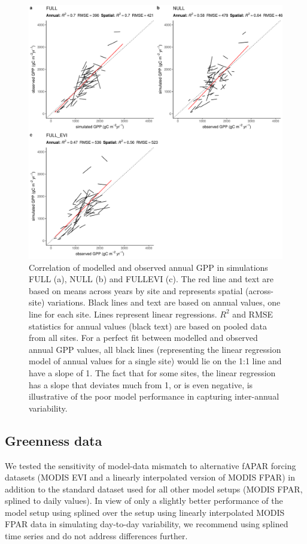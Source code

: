 \documentclass{myreport}
\begin{document}
\begin{figure}[!ht]
    \includegraphics[width=\textwidth]{fig/modobs_spatial_annual.pdf}
    \caption{Correlation of modelled and observed annual GPP in simulations FULL (a), NULL (b) and FULL\textunderscore EVI (c). The red line and text are based on means across years by site and represents spatial (across-site) variations. Black lines and text are based on annual values, one line for each site. Lines represent linear regressions. $R^2$ and RMSE statistics for annual values (black text) are based on pooled data from all sites. For a perfect fit between modelled and observed annual GPP values, all black lines (representing the linear regression model of annual values for a single site) would lie on the 1:1 line and have a slope of 1. The fact that for some sites, the linear regression has a slope that deviates much from 1, or is even negative, is illustrative of the poor model performance in capturing inter-annual variability.}
    \label{fig:modobs_spatialannual}
\end{figure}


\subsection{Greenness data}
\label{sec:results_greenness}

We tested the sensitivity of model-data mismatch to alternative fAPAR forcing datasets (MODIS EVI and a linearly interpolated version of MODIS FPAR) in addition to the standard dataset used for all other model setups (MODIS FPAR, splined to daily values). In view of only a slightly better performance of the model setup using splined  over the setup using linearly interpolated MODIS FPAR data in simulating day-to-day variability, we recommend using splined time series and do not address differences further.
\end{document}
